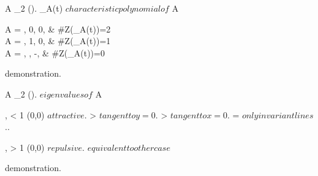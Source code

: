 \documentclass[../Main/main]{subfiles}
\begin{document}
{	
	{
		{
			A \in \Mc_{2 }(\R).
			\chi_A(t) $ characteristic polynomial of $ A
		}
		\holds
		{
			{
				\begin{cases}
				A = \lambda, 0, 0, \mu & \#Z(\chi_A(t))=2\\
				A = \lambda, 1, 0, \lambda & \#Z(\chi_A(t))=1\\
				A = \alpha, \beta, -\beta, \alpha & \#Z(\chi_A(t))=0
				\end{cases}
			}
		}
		\demonstration
		{
			demonstration.
		}
	}
	
	
	{
		{
			A \in \Mc_{2 }(\R).
			\lambda \neq \mu $ eigenvalues of $ A
		}
		\holds
		{
			\abs{ \lambda }, \abs{ \mu } < 1 \imp (0,0) $ attractive $.
			\abs{ \lambda } > \abs{ \mu } \imp $ tangent to y = 0$.
			\abs{ \mu } > \abs{ \lambda } \imp $ tangent to x = 0$.
			\abs{ \mu } = \abs{ \lambda } \imp $ only invariant lines $..

			\abs{ \lambda }, \abs{ \mu } > 1 \imp (0,0) $ repulsive $.
			$ equivalent to other case $
		}
		\demonstration
		{
			demonstration.
		}
	}
	
	
	
	
	
	
	
	
	
	
	
	
	
}
\end{document}
